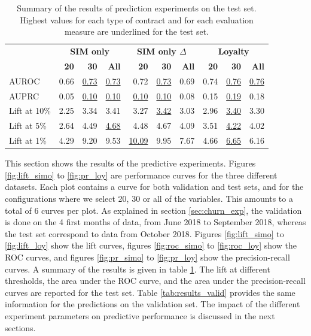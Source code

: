 \begin{table}
    \centering
    \begin{tabular}{lrrrrrrrrr}
        \toprule
        & \multicolumn{3}{c}{\textbf{SIM only}}
        & \multicolumn{3}{c}{\textbf{SIM only $\Delta$}}
        & \multicolumn{3}{c}{\textbf{Loyalty}} \\
        \cmidrule(l){2-4} \cmidrule(l){5-7} \cmidrule(l){8-10}
        & \textbf{20} & \textbf{30} & \textbf{All} & \textbf{20} & \textbf{30} &
        \textbf{All} & \textbf{20} & \textbf{30} & \textbf{All} \\
        \midrule

        AUROC        & 0.66 & \underline{0.73} & \underline{0.73} & 0.72 &
        \underline{0.73} & 0.69 & 0.74 & \underline{0.76} & \underline{0.76} \\

        AUPRC        & 0.05 & \underline{0.10} & \underline{0.10} &
        \underline{0.10} & \underline{0.10} & 0.08 & 0.15 & \underline{0.19} & 0.18 \\

        Lift at 10\% & 2.25 & 3.34 & 3.41 & 3.27 & \underline{3.42} & 3.03 &
        2.96 & \underline{3.40} & 3.30 \\

        Lift at 5\%  & 2.64 & 4.49 & \underline{4.68} & 4.48 & 4.67 & 4.09 &
        3.51 & \underline{4.22} & 4.02 \\

        Lift at 1\%  & 4.29 & 9.20 & 9.53 & \underline{10.09} & 9.95 & 7.67 &
        4.66 & \underline{6.65} & 6.16 \\
        \bottomrule
    \end{tabular}
    \caption{Summary of the results of prediction experiments on the test set.
    Highest values for each type of contract and for each evaluation measure are
    underlined for the test set.}
    \label{tab:results}
\end{table}

This section shows the results of the predictive experiments. Figures
\ref{fig:lift_simo} to \ref{fig:pr_loy} are performance curves for the three
different datasets. Each plot contains a curve for both validation and test
sets, and for the configurations where we select 20, 30 or all of the variables.
This amounts to a total of 6 curves per plot. As explained in section
\ref{sec:churn_exp}, the validation is done on the 4 first months of data, from
June 2018 to September 2018, whereas the test set correspond to data from
October 2018. Figures \ref{fig:lift_simo} to \ref{fig:lift_loy} show the lift
curves, figures \ref{fig:roc_simo} to \ref{fig:roc_loy} show the ROC curves, and
figures \ref{fig:pr_simo} to \ref{fig:pr_loy} show the precision-recall curves.
A summary of the results is given in table \ref{tab:results}. The lift at
different thresholds, the area under the ROC curve, and the area under the
precision-recall curves are reported for the test set. Table
\ref{tab:results_valid} provides the same information for the predictions on the
validation set. The impact of the different experiment parameters on predictive
performance is discussed in the next sections.

